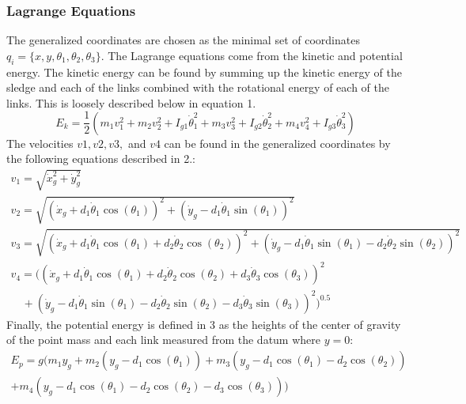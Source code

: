 \documentclass{article}
\begin{document}
\subsubsection{Lagrange Equations}
The generalized coordinates are chosen as the minimal set of coordinates $q_i = \{ x,y,\theta_1,\theta_2,\theta_3 \} $. The Lagrange equations come from the kinetic and potential energy. The kinetic energy can be found by summing up the kinetic energy of the sledge and each of the links combined with the rotational energy of each of the links. This is loosely described below in equation 1.
\begin{equation}\label{Kinetic Energy Equation}
	E_k = \frac{1}{2} \left( m_1 v_1^2 + m_2 v_2^2 + I_{g1} \dot{\theta}_1^2 + m_3 v_3^2 + I_{g2} \dot{\theta}_2^2 + m_4 v_4^2 + I_{g3} \dot{\theta}_3^2 \right) 
\end{equation}
The velocities $v1, v2, v3,$ and $v4$ can be found in the generalized coordinates by the following equations described in 2.:
\begin{equation}
	\begin{split}
		v_1 = \sqrt{\dot{x}_g^2 + \dot{y}_g^2} \\
		v_2 = \sqrt{\left( \dot{x}_g + d_1 \dot{\theta}_1 \cos(\theta_1) \right)^2 + \left( \dot{y}_g - d_1 \dot{\theta}_1 \sin(\theta_1) \right)^2} \\
		v_3 = \sqrt{\left( \dot{x}_g + d_1 \dot{\theta}_1 \cos(\theta_1) + d_2 \dot{\theta}_2 \cos(\theta_2) \right)^2 + \left( \dot{y}_g - d_1 \dot{\theta}_1 \sin(\theta_1) - d_2 \dot{\theta}_2 \sin(\theta_2) \right)^2}\\		
		v_4 = (\left( \dot{x}_g + d_1 \dot{\theta}_1 \cos(\theta_1) + d_2 \dot{\theta}_2 \cos(\theta_2) + d_3 \dot{\theta}_3 \cos(\theta_3) \right)^2 \\
		\quad + \left( \dot{y}_g - d_1 \dot{\theta}_1 \sin(\theta_1) - d_2 \dot{\theta}_2 \sin(\theta_2) - d_3 \dot{\theta}_3 \sin(\theta_3) \right)^2)^{0.5}
	\end{split}
\end{equation}
Finally, the potential energy is defined in 3 as the heights of the center of gravity of the point mass and each link measured from the datum where $y=0$:
\begin{equation}
	\begin{split}
			E_p = g ( m_1 y_g + m_2 \left( y_g - d_1 \cos(\theta_1) \right) + m_3 \left( y_g - d_1 \cos(\theta_1) - d_2 \cos(\theta_2) \right) \\
		+ m_4 \left( y_g - d_1 \cos(\theta_1) - d_2 \cos(\theta_2) - d_3 \cos(\theta_3) \right) )	
	\end{split}
\end{equation}
\newpage
\end{document}
